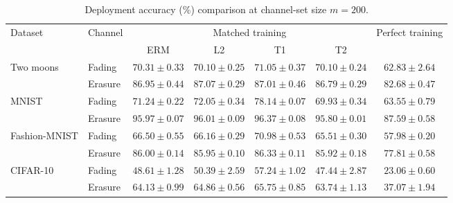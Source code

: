 \begin{table}[htb]
\centering
\caption{Deployment accuracy (\%) comparison at channel-set size $m=200$.}
\label{tab:performance}
\begin{tabular*}{\linewidth}{@{\extracolsep{\fill}}llccccc@{}}
\toprule
\multirow{2}{*}{Dataset} & \multirow{2}{*}{Channel}
& \multicolumn{4}{c}{Matched training} & \multirow{2}{*}{Perfect training} \\
\cmidrule(lr){3-6}
& & ERM & L2 & T1 & T2 &  \\
\midrule
\multirow{2}{*}{Two moons}
& Fading
& $70.31\pm0.33$ & $70.10\pm0.25$ & $\mathbf{71.05}\pm0.37$ & $70.10\pm0.24$ & $62.83\pm2.64$ \\
& Erasure
& $86.95\pm0.44$ & $\mathbf{87.07}\pm0.29$ & $87.01\pm0.46$ & $86.79\pm0.29$ & $82.68\pm0.47$ \\
\midrule
\multirow{2}{*}{MNIST}
& Fading
& $71.24\pm0.22$ & $72.05\pm0.34$ & $\mathbf{78.14}\pm0.07$ & $69.93\pm0.34$ & $63.55\pm0.79$ \\
& Erasure
& $95.97\pm0.07$ & $96.01\pm0.09$ & $\mathbf{96.37}\pm0.08$ & $95.80\pm0.01$ & $87.59\pm0.58$ \\
\midrule
\multirow{2}{*}{Fashion-MNIST}
& Fading
& $66.50\pm0.55$ & $66.16\pm0.29$ & $\mathbf{70.98}\pm0.53$ & $65.51\pm0.30$ & $57.98\pm0.20$ \\
& Erasure
& $86.00\pm0.14$ & $85.95\pm0.10$ & $\mathbf{86.33}\pm0.11$ & $85.92\pm0.18$ & $77.81\pm0.58$ \\
\midrule
\multirow{2}{*}{CIFAR-10}
& Fading
& $48.61\pm1.28$ & $50.39\pm2.59$ & $\mathbf{57.24}\pm1.02$ & $47.44\pm2.87$ & $23.06\pm0.60$ \\
& Erasure
& $64.13\pm0.99$ & $64.86\pm0.56$ & $\mathbf{65.75}\pm0.85$ & $63.74\pm1.13$ & $37.07\pm1.94$ \\
\bottomrule
\end{tabular*}
\end{table}
